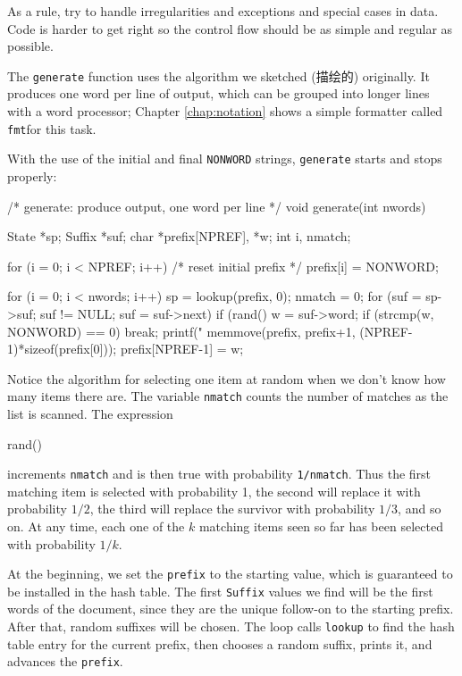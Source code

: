 As a rule, try to handle irregularities and exceptions and special cases in
data.
Code is harder to get right so the control flow should be as simple and
regular as possible.

The \verb'generate' function uses the algorithm we sketched (描绘的)
originally. It produces one word per line of output, which can be grouped
into longer lines with a word processor; Chapter \ref{chap:notation} shows
a simple formatter called \verb'fmt'for this task.

With the use of the initial and final \verb'NONWORD' strings,
\verb'generate' starts and stops properly:
\begin{wellcode}
    /* generate: produce output, one word per line */
    void generate(int nwords)
    {
        State   *sp;
        Suffix  *suf;
        char    *prefix[NPREF], *w;
        int     i, nmatch;

        for (i = 0; i < NPREF; i++) /* reset initial prefix */
            prefix[i] = NONWORD;

        for (i = 0; i < nwords; i++) {
            sp = lookup(prefix, 0);
            nmatch = 0;
            for (suf = sp->suf; suf != NULL; suf = suf->next)
                if (rand() %
                    w = suf->word;
            if (strcmp(w, NONWORD) == 0)
                break;
            printf("%
            memmove(prefix, prefix+1, (NPREF-1)*sizeof(prefix[0]));
            prefix[NPREF-1] = w;
        }
    }
\end{wellcode}

Notice the algorithm for selecting one item at random when we don't know
how many items there are. The variable \verb'nmatch' counts the number of
matches as the list is scanned. The expression
\begin{wellcode}
    rand() %
\end{wellcode}
increments \verb'nmatch' and is then true with probability \verb'1/nmatch'.
Thus the first matching item is selected with probability 1, the second
will replace it with probability $1/2$, the third will replace the survivor
with probability $1/3$, and so on. At any time, each one of the $k$
matching items seen so far has been selected with probability $1/k$.

At the beginning, we set the \verb'prefix' to the starting value, which is
guaranteed to be installed in the hash table. The first \verb'Suffix'
values we find will be the first words of the document, since they are the
unique follow-on to the starting prefix. After that, random suffixes will
be chosen. The loop calls \verb'lookup' to find the hash table entry for
the current prefix, then chooses a random suffix, prints it, and advances
the \verb'prefix'.

